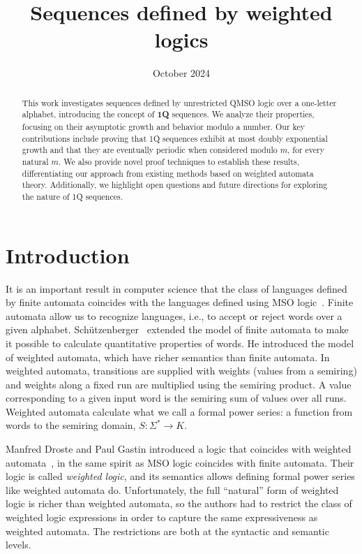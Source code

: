 \documentclass[en]{pracamgr}
\title{Sequences defined by weighted logics}
\date{October 2024}
\theoremstyle{definition}
\begin{document}
\maketitle

\begin{abstract}
    This work investigates sequences defined by unrestricted QMSO logic over a one-letter alphabet, introducing the concept of \textbf{1Q} sequences. We analyze their properties, focusing on their asymptotic growth and behavior modulo a number. Our key contributions include proving that 1Q sequences exhibit at most doubly exponential growth and that they are eventually periodic when considered modulo $m$, for every natural $m$. We also provide novel proof techniques to establish these results, differentiating our approach from existing methods based on weighted automata theory. Additionally, we highlight open questions and future directions for exploring the nature of 1Q sequences.
  \end{abstract}
  
\tableofcontents

\chapter{Introduction}
It is an important result in computer science that the class of languages defined by finite automata coincides with the languages defined using MSO logic~\cite{Buchi1960}. Finite automata allow us to recognize languages, i.e., to accept or reject words over a given alphabet. Sch{\"{u}}tzenberger~\cite{Schutzenberger61b} extended the model of finite automata to make it possible to calculate quantitative properties of words. He introduced the model of weighted automata, which have richer semantics than finite automata. In weighted automata, transitions are supplied with weights (values from a semiring) and weights along a fixed run are multiplied using the semiring product. A value corresponding to a given input word is the semiring sum of values over all runs. Weighted automata calculate what we call a formal power series: a function from words to the semiring domain, $S: \Sigma^* \rightarrow K$.

Manfred Droste and Paul Gastin introduced a logic that coincides with weighted automata~\cite{DrosteG07}, in the same spirit as MSO logic coincides with finite automata. Their logic is called \emph{weighted logic}, and its semantics allows defining formal power series like weighted automata do. Unfortunately, the full ``natural'' form of weighted logic is richer than weighted automata, so the authors had to restrict the class of weighted logic expressions in order to capture the same expressiveness as weighted automata. The restrictions are both at the syntactic and semantic levels.
\end{document}
